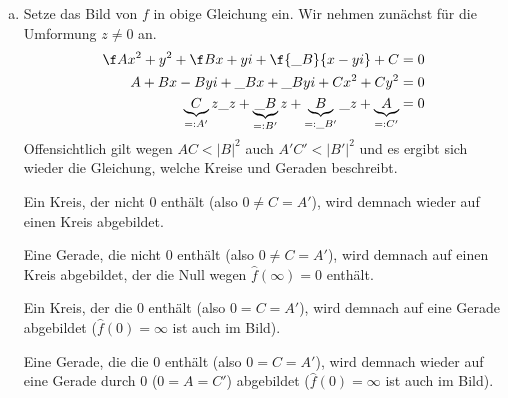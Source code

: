 \documentclass{mywork}
\begin{document}
\begin{aufgabe}
\begin{enumerate}[a)]
\begin{seg}{Lösungen der Gleichung sind Geraden und Kreise}
					Sei jetzt eine Gerade gegeben (also $A=0$).
					Dann ergibt sich nach kurzer Umformung
					\[
						(\Re B) x - (\Im B)y + C = 0
					\]
					Für $\Im B\neq 0$ ergibt sich eine Geradengleichung der Form
					\[
						y = \f {\Re B}{\Im B}x + \f C{\Im B}
					\]
					Aus $\Im B = 0$ folgt unmittelbar wegen $0=AC<|B|^2$, dass $\Re B\neq 0$ und es ergibt sich eine Gerade der Form
					\[
						x= -\f C{\Re B}
					\]
				\end{seg}
			\item
				Setze das Bild von $f$ in obige Gleichung ein.
				Wir nehmen zunächst für die Umformung $z\neq 0$ an.
				\begin{align*}
					\f A{x^2+y^2} + \f B{x+yi} + \f {\_B}{x-yi} + C &= 0\\
						   A + Bx -Byi + \_B x + \_Byi + Cx^2 +Cy^2 &= 0\\
		   \underbrace{C}_{=:A'}z\_z + \underbrace{\_B}_{=:B'}z + \underbrace{B}_{=:\_{B'}}\_z + \underbrace{A}_{=:C'} &= 0
				\end{align*}
				Offensichtlich gilt wegen $AC<|B|^2$ auch $A'C'<|B'|^2$ und es ergibt sich wieder die Gleichung, welche Kreise und Geraden beschreibt.

				Ein Kreis, der nicht $0$ enthält (also $0\neq C=A'$), wird demnach wieder auf einen Kreis abgebildet.

				Eine Gerade, die nicht $0$ enthält (also $0\neq C=A'$), wird demnach auf einen Kreis abgebildet, der die Null wegen $\hat f(\infty)=0$ enthält.

				Ein Kreis, der die $0$ enthält (also $0=C=A'$), wird demnach auf eine Gerade abgebildet ($\hat f(0)=\infty$ ist auch im Bild).

				Eine Gerade, die die $0$ enthält (also $0=C=A'$), wird demnach wieder auf eine Gerade durch $0$ ($0=A=C'$) abgebildet ($\hat f(0)=\infty$ ist auch im Bild).
		\end{enumerate}
	\end{aufgabe}
\end{document}
